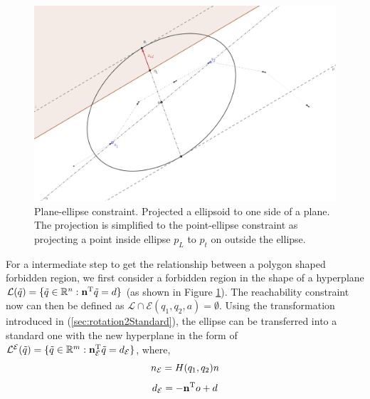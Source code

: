 \documentclass[journal]{IEEEtran}  %
\begin{document}
\begin{figure}[htbp]
\begin{center}
\includegraphics[width=0.6\linewidth]{Ellipse2line_V2}
\caption{Plane-ellipse constraint. Projected a ellipsoid to one side of a plane. The projection is simplified to the point-ellipse constraint as projecting a point inside ellipse $p_{L}$ to $p_{t}$ on outside the ellipse.}
\label{fig:Ellipse-to-plane}
\end{center}
\end{figure}

For a intermediate step to get the relationship between a polygon shaped forbidden region, we first consider a forbidden region in the shape of a hyperplane $\mathcal{L}(\tilde{q}) = \{\tilde{q}\in\mathbb{R}^n: \mathbf{n}^\mathrm{T} \tilde{q} = d\}$ (as shown in Figure \ref{fig:Ellipse-to-plane}). The reachability constraint now can then be defined as $\mathcal{L} \cap \mathcal{E}(q_1,q_2,a) = \emptyset$.
  Using the transformation introduced in (\ref{sec:rotation2Standard}), the ellipse can be transferred into a standard one with the new hyperplane in the form of ${\mathcal{L}^{\mathcal{E}}}(\tilde{q}) = \{  \tilde{q}\in\mathbb{R}^m:  \mathbf{n}_{\mathcal{E}}^\mathrm{T} \tilde{q} = d_{\mathcal{E}}\}$, where,
  \begin{equation}
    n_{\mathcal{E}} = H(q_1,q_2)n
\end{equation}
\begin{equation} 
	d_{\mathcal{E}} =-\mathbf{n}^\mathrm{T} o + d
  \end{equation}
\end{document}
